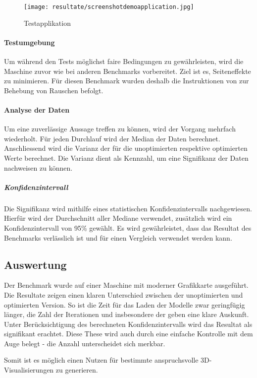 \begin{figure}[H]
  \centering
  \texttt{[image: resultate/screenshotdemoapplication.jpg]}
  \caption{Testapplikation}
  \label{fig:demoApplication}
\end{figure}

\paragraph{Testumgebung}
Um während den Tests möglichst faire Bedingungen zu gewährleisten, wird die Maschine zuvor wie bei anderen Benchmarks vorbereitet. Ziel ist es, Seiteneffekte zu minimieren. Für diesen Benchmark wurden deshalb die Instruktionen von  zur Behebung von Rauschen befolgt.
\cite{tracerBenchNoiseMitigation}

\paragraph{Analyse der Daten}
Um eine zuverlässige Aussage treffen zu können, wird der Vorgang mehrfach wiederholt. Für jeden Durchlauf wird der Median der  Daten berechnet.
Anschliessend wird die Varianz der  für die unoptimierten respektive optimierten Werte berechnet. Die Varianz dient als Kennzahl, um eine Signifikanz der Daten nachweisen zu können.

\subparagraph{Konfidenzintervall}
Die Signifikanz wird mithilfe eines statistischen Konfidenzintervalls nachgewiesen. Hierfür wird der Durchschnitt aller Mediane verwendet, zusätzlich wird ein Konfidenzintervall von 95\% gewählt. Es wird gewährleistet, dass das Resultat des Benchmarks verlässlich ist und für einen Vergleich verwendet werden kann.

\subsection{Auswertung}

Der Benchmark wurde auf einer Maschine mit moderner Grafikkarte ausgeführt. Die Resultate zeigen einen klaren Unterschied zwischen der unoptimierten und optimierten Version. So ist die Zeit für das Laden der Modelle zwar geringfügig länger, die Zahl der  Iterationen und insbesondere der  geben eine klare Auskunft. Unter Berücksichtigung des berechneten Konfidenzintervalls wird das Resultat als signifikant erachtet. Diese These wird auch durch eine einfache Kontrolle mit dem Auge belegt - die Anzahl  unterscheidet sich merkbar.

Somit ist es möglich einen Nutzen für bestimmte anspruchsvolle 3D-Visualisierungen zu generieren.